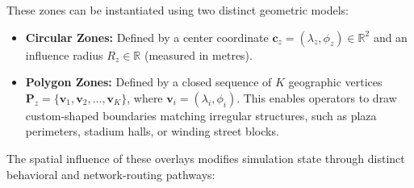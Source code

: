 \documentclass[12pt,a4paper,oneside]{report}
\begin{document}
These zones can be instantiated using two distinct geometric models:
\begin{itemize}
    \item \textbf{Circular Zones:} Defined by a center coordinate $\mathbf{c}_z = (\lambda_z, \phi_z) \in \mathbb{R}^2$ and an influence radius $R_z \in \mathbb{R}$ (measured in metres).
    \item \textbf{Polygon Zones:} Defined by a closed sequence of $K$ geographic vertices $\mathbf{P}_z = \{\mathbf{v}_1, \mathbf{v}_2, \dots, \mathbf{v}_K\}$, where $\mathbf{v}_i = (\lambda_i, \phi_i)$. This enables operators to draw custom-shaped boundaries matching irregular structures, such as plaza perimeters, stadium halls, or winding street blocks.
\end{itemize}

The spatial influence of these overlays modifies simulation state through distinct behavioral and network-routing pathways:
\end{document}
